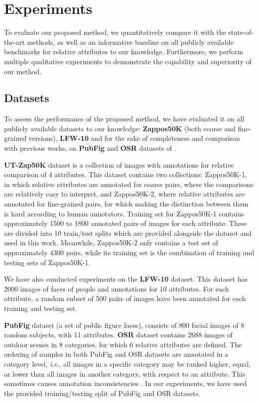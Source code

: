 \documentclass[runningheads]{llncs}
\newcommand{\ie}{\textit{i}.\textit{e}.}
\begin{document}

\section{Experiments}\label{sec.4}

To evaluate our proposed method, we quantitatively compare it  with the state-of-the-art methods, as well as an informative baseline on all publicly available benchmarks for relative attributes to our knowledge. Furthermore, we perform multiple qualitative experiments to demonstrate the capability and superiority of our method.

\subsection{Datasets}\label{sec.4.1}

To assess the performance of the proposed method, we have evaluated it on all publicly available datasets to our knowledge: \textbf{Zappos50K} \cite{Yu2014} (both coarse and fine-grained versions), \textbf{LFW-10} \cite{Sandeep_2014_CVPR} and for the sake of completeness and comparison with previous works, on \textbf{PubFig} and \textbf{OSR} datasets of \cite{parikh2011}.

\textbf{UT-Zap50K} \cite{Yu2014} dataset is a collection of images with annotations for relative comparison of 4 attributes. This dataset contains two collections: Zappos50K-1, in which relative attributes are annotated for coarse pairs, where the comparisons are relatively easy to interpret, and Zappos50K-2, where relative attributes are annotated for fine-grained pairs, for which making the distinction between them is hard according to human annotators.
Training set for Zappos50K-1 contains approximately 1500 to 1800 annotated pairs of images for each attribute. These are divided into 10 train/test splits which are provided alongside the dataset and used in this work. Meanwhile, Zappos50K-2 only contains a test set of approximately 4300 pairs, while its training set is the combination of training and testing sets of Zappos50K-1.

We have also conducted experiments on the \textbf{LFW-10} \cite{Sandeep_2014_CVPR} dataset. This dataset has 2000 images of faces of people and annotations for 10 attributes. For each attribute, a random subset of 500 pairs of images have been annotated for each training and testing set.

\textbf{PubFig} \cite{parikh2011} dataset (a set of public figure faces), consists of 800 facial images of 8 random subjects, with 11 attributes.
\textbf{OSR} \cite{parikh2011} dataset contains 2688 images of outdoor scenes in 8 categories, for which 6 relative attributes are defined.
The ordering of samples in both PubFig and OSR datasets are annotated in a category level, \ie, all images in a specific category may be ranked higher, equal, or lower than all images in another category, with respect to an attribute. This sometimes causes annotation inconsistencies \cite{Sandeep_2014_CVPR}.
In our experiments, we have used the provided training/testing split of PubFig and OSR datasets.
\end{document}
